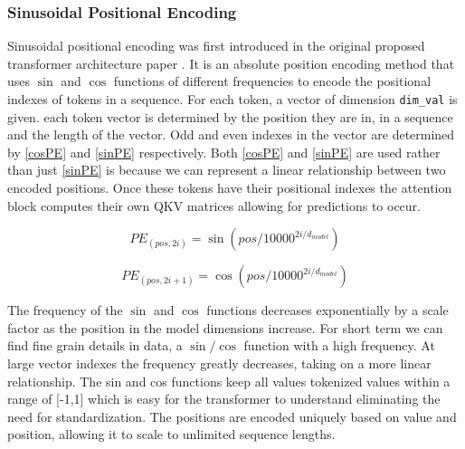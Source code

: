\subsubsection{Sinusoidal Positional Encoding}
Sinusoidal positional encoding was first introduced in the original proposed transformer architecture paper \cite{vaswani2017attention}. It is an absolute position encoding method that uses $\sin$ and $\cos$ functions of different frequencies to encode the positional indexes of tokens in a sequence. For each token, a vector of dimension \texttt{dim\_val} is given. each token vector is determined by the position they are in, in a sequence and the length of the vector.  Odd and even indexes in the vector are determined by \eqref{cosPE} and \eqref{sinPE} respectively. Both \eqref{cosPE} and \eqref{sinPE} are used rather than just \eqref{sinPE} is because we can represent a linear relationship between two encoded positions. Once these tokens have their positional indexes the attention block computes their own QKV matrices allowing for predictions to occur.

\begin{equation}
    \label{sinPE}
   PE_{(pos,2i)} = \sin (pos / 10000^{2i/d_{model}}) 
\end{equation}

\begin{equation}
    \label{cosPE}
   PE_{(pos,2i+1)} = \cos(pos/10000^{2i/d_{model}})
\end{equation}

 The frequency of the $\sin$ and $\cos$ functions decreases exponentially by a scale factor as the position in the model dimensions increase. For short term we can find fine grain details in data, a $\sin/\cos$ function with a high frequency. At large vector indexes the frequency greatly decreases, taking on a more linear relationship. The sin and cos functions keep all values tokenized values within a range of [-1,1] which is easy for the transformer to understand eliminating the need for standardization. The positions are encoded uniquely based on value and position, allowing it to scale to unlimited sequence lengths. 



